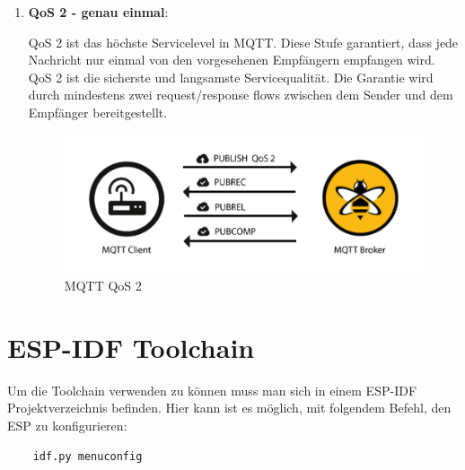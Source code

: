 \begin{enumerate}
    \item \textbf{QoS 2 - genau einmal}:
    
    QoS 2 ist das höchste Servicelevel in MQTT. Diese Stufe garantiert, dass jede Nachricht nur einmal von den vorgesehenen Empfängern empfangen wird. QoS 2 ist die sicherste und langsamste Servicequalität. Die Garantie wird durch mindestens zwei request/response flows zwischen dem Sender und dem Empfänger bereitgestellt. \cite{hivemq}

    \begin{figure}[H]
        \begin{center}
            \includegraphics[scale=0.8]{images/QoS-2.png}
            \caption{MQTT QoS 2 \cite{hivemq}}
        \end{center}
    \end{figure}
\end{enumerate}

\section{ESP-IDF Toolchain}\label{sec:esp-idf-toolchain}
Um die Toolchain verwenden zu können muss man sich in einem ESP-IDF Projektverzeichnis befinden. Hier kann ist es möglich, mit folgendem Befehl, den ESP zu konfigurieren:

\begin{verbatim}
    idf.py menuconfig
\end{verbatim}

